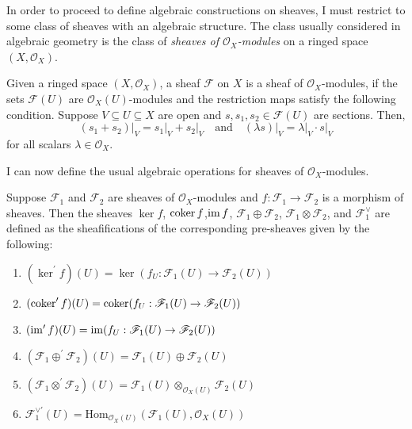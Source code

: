 In order to proceed to define algebraic constructions on sheaves, I must
restrict to some class of sheaves with an algebraic structure. The class
usually considered in algebraic geometry is the class of
\emph{sheaves of $\mathscr{O}_{X}$-modules} on a ringed space
$(X,\mathscr{O}_{X})$.
\begin{defin}
  Given a ringed space $(X,\mathscr{O}_{X})$, a sheaf $\mathscr{F}$ on $X$
  is a sheaf of $\mathscr{O}_{X}$-modules, if the sets $\mathscr{F}(U)$
  are $\mathscr{O}_{X}(U)$-modules and the restriction maps satisfy the
  following condition. Suppose $V\subseteq U\subseteq X$ are open and
  $s,s_{1}, s_{2}\in\mathscr{F}(U)$ are sections. Then,
  \[
    (s_{1}+s_{2})\vert_{V}=s_{1}\vert_{V}+s_{2}\vert_{V}\quad
    \text{and}\quad (\lambda s)\vert_{V}=\lambda\vert_{V}\cdot s\vert_{V}
  \]
  for all scalars $\lambda\in\mathscr{O}_{X}$.
\end{defin}
I can now define the usual algebraic operations for sheaves of
$\mathscr{O}_{X}$-modules.
\begin{defin}\label{def:sheaf_algebra}
  Suppose $\mathscr{F}_{1}$ and $\mathscr{F}_{2}$ are sheaves of
  $\mathscr{O}_{X}$-modules and $f:\mathscr{F}_{1}\to\mathscr{F}_{2}$ is a
  morphism of sheaves. Then the sheaves $\ker f$, $\operatorname{coker} f$,$\operatorname{im} f$,
  $\mathscr{F}_{1}\oplus\mathscr{F}_{2}$, $\mathscr{F}_{1}\otimes
  \mathscr{F}_{2}$, and $\mathscr{F}_{1}^{\vee}$ are defined as the
  sheafifications of the corresponding pre-sheaves given by the following:
  \begin{enumerate}
    \item $(\ker^{\prime} f)(U) = \ker(f_{U}:\mathscr{F}_{1}(U)
          \to\mathscr{F}_{2}(U))$
    \item $(\operatorname{coker}^{\prime} f)(U) = \operatorname{coker}(f_{U}:\mathscr{F}_{1}(U)
          \to\mathscr{F}_{2}(U))$
    \item $(\operatorname{im}^{\prime} f)(U)=\operatorname{im}(f_{U}:\mathscr{F}_{1}(U)
          \to\mathscr{F}_{2}(U))$
    \item $(\mathscr{F}_{1}\oplus^{\prime}\mathscr{F}_{2})(U)=\mathscr{F}_{1}(U)
          \oplus\mathscr{F}_{2}(U)$
    \item $(\mathscr{F}_{1}\otimes^{\prime}\mathscr{F}_{2})(U)
          =\mathscr{F}_{1}(U)\otimes_{\mathscr{O}_{X}(U)}\mathscr{F}_{2}(U)$
    \item $\mathscr{F}_{1}^{\vee\prime}(U)=\text{Hom}_{\mathscr{O}_{X}(U)}(
          \mathscr{F}_{1}(U),\mathscr{O}_{X}(U))$
  \end{enumerate}
\end{defin}
